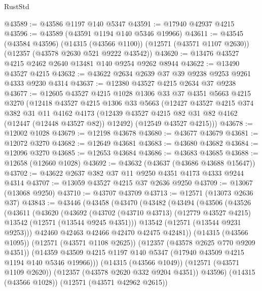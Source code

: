 \begin{lexlean}{RustStd}
\begin{coremodule}
@43589 := @43586 @1197 @140 @5347
@43591 := @17940 @42937 @4215
@43596 := @43589 (@43591 @1194 @140 @5346 @19966)
@43611 := @43545
    (@43584 @43596)
    (@14315 (@43566 @1100))
    (@12571 (@43571 @1107 @2630))
    (@12357 (@43578 @2630 @521 @9222 @43542))
@43620 := @13476 @43527 @4215 @2462 @2640 @13481 @140 @9254 @9262 @8944
@43622 := @13490 @43527 @4215
@43632 := @43622 @2634 @2639 @37 @39 @9238 @9253 @9261 @4333 @9230 @4314
@43637 := @12380 @43527 @4215 @2634 @37 @9238
@43677 := @12605
    @43527
    @4215
    @1028
    @1306
    @33
    @37
    @4351
    @5663
    @4215
    @3270
    (@12418
      @43527
      @4215
      @1306
      @33
      @5663
      (@12427
        @43527
        @4215
        @374
        @382
        @31
        @11
        @4162
        @4173
        (@12439 @43527 @4215 @82 @31 @82 @4162 (@12447 (@12448 @43527 @82)) @12492)
        (@12549 @43527 @4215)))
@43678 := @12002 @1028
@43679 := @12198 @43678
@43680 := @43677 @43679
@43681 := @12072 @3270
@43682 := @12649 @43681
@43683 := @43680 @43682
@43684 := @12096 @3270
@43685 := @12653 @43684
@43686 := @43683 @43685
@43688 := @12658 (@12660 @1028)
@43692 := @43632 (@43637 (@43686 @43688 @15647))
@43702 := @43622 @2637 @382 @37 @11 @9250 @4351 @4173 @4333 @9244 @4314
@43707 := @13059 @43527 @4215 @37 @2636 @9250
@43709 := @13067 (@13068 @9250)
@43710 := @43707 @43709
@43713 := @12571 (@13073 @2636 @37)
@43843 := @43446
    (@43458
      (@43470
        (@43482
          (@43494
            (@43506
              (@43526
                (@43611
                  (@43620
                    (@43692
                      (@43702
                        (@43710 @43713)
                        (@12779 @43527 @4215)
                        @13542
                        (@12571 (@13544 @9245 @4351)))
                      @13542
                      (@12571 (@13544 @9231 @9253)))
                    @42460
                    @42463
                    @42466
                    @42470
                    @42475
                    @42481))
                (@14315 (@43566 @1095))
                (@12571 (@43571 @1108 @2625))
                (@12357 (@43578 @2625 @770 @9209 @4351))
                (@14359
                  @43509
                  @4215
                  @1197
                  @140
                  @5347
                  (@17940 @43509 @4215 @1194 @140 @5346 @19966)))
              (@14315 (@43566 @1049))
              (@12571 (@43571 @1109 @2620))
              (@12357 (@43578 @2620 @332 @9204 @4351))
              @43596)
            (@14315 (@43566 @1028))
            (@12571 (@43571 @42962 @2615))

\end{coremodule}
\end{lexlean}
